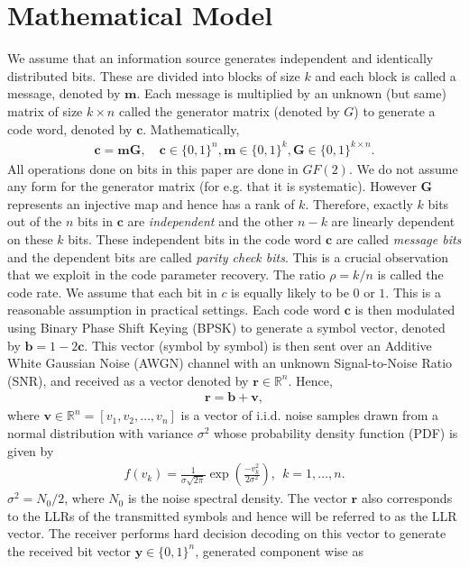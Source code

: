 \documentclass[conference]{IEEEtran}
\def\c{\mathbf{c}}
\def\m{\mathbf{m}}
\def\r{\mathbf{r}}
\def\v{\mathbf{v}}
\def\G{\mathbf{G}}
\def\b{\mathbf{b}}
\def\y{\mathbf{y}}
\begin{document}
\section{Mathematical Model}
We assume that an information source generates independent and identically distributed  bits. These are divided into blocks of size $k$ and each block is called a message, denoted by $\m$. Each message is multiplied by an unknown (but same) matrix of size $k \times n$ called the generator matrix (denoted by $G$) to generate a code word, denoted by $\c$. Mathematically,
\begin{align*}
    \c = \m \G, \quad \c \in \{0,1\}^n, \m \in \{0, 1\}^k, \G \in \{0, 1\}^{k\times n}.
\end{align*}
All operations done on bits in this paper are done in $GF(2)$. We do not assume any form for the generator matrix (for e.g. that it is systematic). However $\G$ represents an injective map and hence has a rank of $k$. Therefore, exactly $k$ bits out of the $n$ bits in $\c$ are \textit{independent} and the other $n-k$ are linearly dependent on these $k$ bits. These independent bits in the code word $\c$ are called \textit{message bits} and the dependent bits are called \textit{parity check bits}. This is a crucial observation that we exploit in the code parameter recovery. The ratio $\rho = k/n$ is called the code rate. We assume that each bit in $c$ is equally likely to be $0$ or $1$. This is a reasonable assumption in practical settings. Each code word $\c$ is then modulated using Binary Phase Shift Keying (BPSK) to generate a symbol vector, denoted by
    $ \b = 1-2\c$.
 This vector (symbol by symbol) is then sent over an Additive White Gaussian Noise (AWGN) channel with an unknown Signal-to-Noise Ratio (SNR), and received as a vector denoted by $\r \in \mathbb{R}^n$. Hence,
\begin{align}\label{1}
    \r = \b + \v,
\end{align}
where $\v\in \mathbb{R}^{n} = [v_1,v_2,\hdots, v_n]$ is a vector of i.i.d. noise samples drawn  from a normal distribution with variance
$\sigma^2$ 
whose probability density function (PDF) is given by
\begin{align*}
    f(v_k) = \frac{1}{\sigma \sqrt{2\pi}} \exp \left(\frac{-v_k^2}{2\sigma^2}\right), ~~ k= 1,\hdots, n.
\end{align*}
$\sigma^2 = N_0/2$, where $N_0$ is the noise spectral density. The vector $\r$ also corresponds to the LLRs of the transmitted symbols and hence will be referred to as the LLR vector. The receiver performs hard decision decoding on this vector to generate the received bit vector $\y \in \{0, 1\}^n$, generated component wise as
\end{document}
